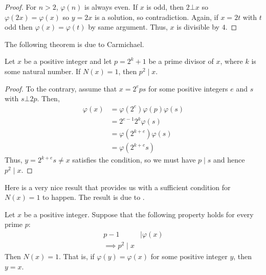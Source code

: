 \documentclass[main.tex]{subfile}
\begin{document}
		\begin{proof}
			For $n>2$, $\varphi(n)$ is always even. If $x$ is odd, then $2\bot x$ so $\varphi(2x)=\varphi(x)$ so $y=2x$ is a solution, so contradiction. Again, if $x=2t$ with $t$ odd then $\varphi(x)=\varphi(t)$ by same argument. Thus, $x$ is divisible by $4$.
		\end{proof}
	The following theorem is due to Carmichael.

		\begin{theorem}
			Let $x$ be a positive integer and let $p=2^k+1$ be a prime divisor of $x$, where $k$ is some natural number. If $N(x)=1$, then $p^2\mid x$.
		\end{theorem}

		\begin{proof}
			To the contrary, assume that $x=2^eps$ for some positive integers $e$ and $s$ with $s\bot 2p$. Then,
				\begin{align*}
					\varphi(x)  & = \varphi(2^e)\varphi(p)\varphi(s)\\
							& = 2^{e-1}2^k\varphi(s)\\
							& = \varphi(2^{k+e})\varphi(s)\\
							& = \varphi(2^{k+e}s)
				\end{align*}
			Thus, $y=2^{k+e}s\neq x$ satisfies the condition, so we must have $p\mid s$ and hence $p^2\mid x$.
		\end{proof}
	Here is a very nice result that provides us with a sufficient condition for $N(x)=1$ to happen. The result is due to \textcite{pomerance_1974}.
		\begin{theorem}
			 Let $x$ be a positive integer. Suppose that the following property holds for every prime $p$:
				\begin{align*}
					p-1
						& \mid \varphi(x)\\
					\implies p^2\mid x
				\end{align*}
			Then $N(x)=1$. That is, if $\varphi(y)=\varphi(x)$ for some positive integer $y$, then $y=x$.
		\end{theorem}
\end{document}
